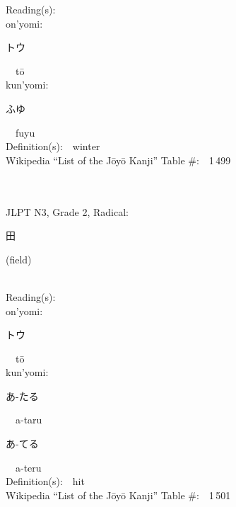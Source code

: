 \begin{multicols}{2}
Reading(s):\ \ \\
{\hspace*{1em}}on'yomi:\ \ \\
{\hspace*{2em}}{\begin{CJK}{UTF8}{min} トウ \end{CJK}}\ \ t\=o\ \ \\
{\hspace*{1em}}kun'yomi:\ \ \\
{\hspace*{2em}}{\begin{CJK}{UTF8}{min} ふゆ \end{CJK}}\ \ fuyu\ \ \\
Definition(s):\ \ winter \\
Wikipedia ``List of the J\=oy\=o Kanji'' Table \#:\ \ 1\,499 \\
\ \ \\
{\fontsize{34pt}{40pt}  }\ \ \\  %
{JLPT N3, Grade 2, Radical:\ \ {\begin{CJK}{UTF8}{min} 田 \end{CJK}} (field) } \\
Reading(s):\ \ \\
{\hspace*{1em}}on'yomi:\ \ \\
{\hspace*{2em}}{\begin{CJK}{UTF8}{min} トウ \end{CJK}}\ \ t\=o\ \ \\
{\hspace*{1em}}kun'yomi:\ \ \\
{\hspace*{2em}}{\begin{CJK}{UTF8}{min} あ-たる \end{CJK}}\ \ a-taru\ \ \\
{\hspace*{2em}}{\begin{CJK}{UTF8}{min} あ-てる \end{CJK}}\ \ a-teru\ \ \\
Definition(s):\ \ hit \\
Wikipedia ``List of the J\=oy\=o Kanji'' Table \#:\ \ 1\,501 \\
\ \ \\

\end{multicols}
